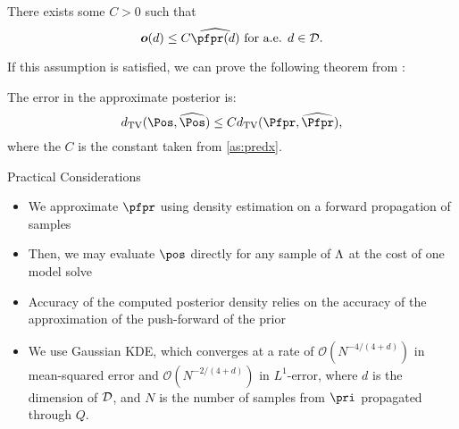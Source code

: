 \begin{frame}[t]
\begin{assumption}\label{as:predx}
There exists some $C>0$ such that
\[
\obs (d) \leq C \widehat{\pfpr(d)} \text{ for a.e. } d\in \dspace.
\]
\end{assumption}

If this assumption is satisfied, we can prove the following theorem from \cite{BJW18}:

\begin{theorem}
The error in the approximate posterior is:
\begin{equation}\label{eq:pfpr_bound}
d_{\text{TV}} (\Pos, \widehat{\Pos}) \leq C d_{\text{TV}} (\Pfpr, \widehat{\Pfpr}),
\end{equation}
where the $C$ is the constant taken from \eqref{as:predx}. 
\end{theorem}

\end{frame}


\begin{frame}[t]{Practical Considerations}

\begin{itemize}
	\item <1-> We approximate $\pfpr$ using density estimation on a forward propagation of samples
	\item <2-> Then, we may evaluate $\pos$ directly for any sample of ${\Lambda}$ at the cost of one model solve
	\item <3-> Accuracy of the computed posterior density relies on the accuracy of the approximation of the push-forward of the prior
	\item <4-> We use Gaussian KDE, which converges at a rate of $\mathcal{O}(N^{-4/(4+d)})$ in mean-squared error and $\mathcal{O}(N^{-2/(4+d)})$ in $L^1$-error, where $d$ is the dimension of $\mathcal{D}$, and $N$ is the number of samples from $\pri$ propagated through $Q$.

\end{itemize}
\end{frame}
